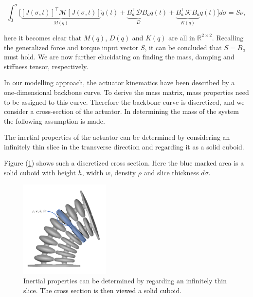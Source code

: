 \begin{equation}
    \int_0^\sigma \Big[ \underbrace{[J(\sigma,t)]^\top \mathcal{M} [J(\sigma,t)]}_{M(q)} \ddot{q}(t) +  \underbrace{B_a^\top \mathcal{D} B_a }_{D} \dot{q}(t)    +   \underbrace{B_a^\top \mathcal{K} B_a}_{K(q)} q(t)\Big] d\sigma = S\nu,
\end{equation}

here it becomes clear that $M(q)$, $D(q)$ and $K(q)$ are all in $\mathbb{R}^{2\times2}$. Recalling the generalized force and torque input vector $S$, it can be concluded that $S = B_a$ must hold. We are now further elucidating on finding the mass, damping and stiffness tensor, respectively.

In our modelling approach, the actuator kinematics have been described by a one-dimensional backbone curve. To derive the mass matrix, mass properties need to be assigned to this curve. Therefore the backbone curve is discretized, and we consider a cross-section of the actuator. In determining the mass of the system the following assumption is made.

\begin{theorem}
The inertial properties of the actuator can be determined by considering an infinitely thin slice in the transverse direction and regarding it as a solid cuboid.
\end{theorem}

Figure (\ref{fig:massapprox}) shows such a discretized cross section. Here the blue marked area is a solid cuboid with height $h$, width $w$, density $\rho$ and slice thickness $d\sigma$. 


\begin{figure}[H]
    \centering
    \includegraphics[width = 0.4\textwidth]{Figures/Chapter2/massapprox.png}
    \caption{Inertial properties can be determined by regarding an infinitely thin slice. The cross section is then viewed a solid cuboid.}
    \label{fig:massapprox}
\end{figure}


